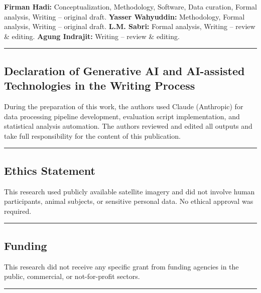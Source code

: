 \documentclass[
  12pt,
]{article}
\begin{document}
\textbf{Firman Hadi:} Conceptualization, Methodology, Software, Data curation, Formal analysis, Writing -- original draft. \textbf{Yasser Wahyuddin:} Methodology, Formal analysis, Writing -- original draft. \textbf{L.M. Sabri:} Formal analysis, Writing -- review \& editing. \textbf{Agung Indrajit:} Writing -- review \& editing.

\begin{center}\rule{0.5\linewidth}{0.5pt}\end{center}

\subsection{Declaration of Generative AI and AI-assisted Technologies in the Writing Process}\label{declaration-of-generative-ai-and-ai-assisted-technologies-in-the-writing-process}

During the preparation of this work, the authors used Claude (Anthropic) for data processing pipeline development, evaluation script implementation, and statistical analysis automation. The authors reviewed and edited all outputs and take full responsibility for the content of this publication.

\begin{center}\rule{0.5\linewidth}{0.5pt}\end{center}

\subsection{Ethics Statement}\label{ethics-statement}

This research used publicly available satellite imagery and did not involve human participants, animal subjects, or sensitive personal data. No ethical approval was required.

\begin{center}\rule{0.5\linewidth}{0.5pt}\end{center}

\subsection{Funding}\label{funding}

This research did not receive any specific grant from funding agencies in the public, commercial, or not-for-profit sectors.

\begin{center}\rule{0.5\linewidth}{0.5pt}\end{center}
\end{document}
